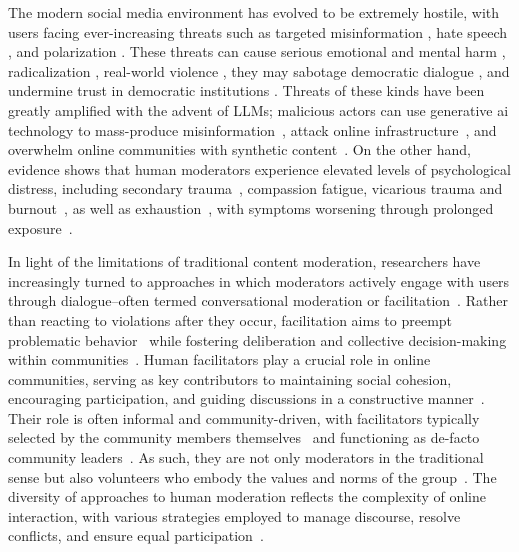 The modern social media environment has evolved to be extremely hostile, with users facing ever-increasing threats such as targeted misinformation \cite{clemons2025disinformation,Denniss2025Social}, hate speech \cite{kolluri2025parler}, and polarization \cite{pranesh2024impactsocialmediapolarization}. These threats can cause serious emotional and mental harm \cite{proactive_moderation}, radicalization \cite{cho-etal-2024-language}, real-world violence \cite{schaffner_community_guidelines}, they may sabotage democratic dialogue \cite{esau2017design,falk-etal-2021-predicting,seering_self_moderation}, and undermine trust in democratic institutions \cite{schroeder-etal-2024-fora}. Threats of these kinds have been greatly amplified with the advent of LLMs; malicious actors can use generative \ac{ai} technology to mass-produce misinformation~\cite{kreps2023ai, summerfield2024will}, attack online infrastructure~\cite{summerfield2024will}, and overwhelm online communities with synthetic content~\cite{saura2025synthetification}. On the other hand, evidence shows that human moderators experience elevated levels of psychological distress, including secondary trauma~\cite{spence2024content}, compassion fatigue, vicarious trauma and burnout~\cite{spence2023psychological}, as well as exhaustion~\cite{steiger2021psychological}, with symptoms worsening through prolonged exposure~\cite{spence2024content}.

In light of the limitations of traditional content moderation, researchers have increasingly turned to approaches in which moderators actively engage with users through dialogue--often termed conversational moderation or facilitation~\cite{argyle2023, korre2025evaluation, falk-etal-2021-predicting, cho-etal-2024-language}. Rather than reacting to violations after they occur, facilitation aims to preempt problematic behavior~\cite{cho-etal-2024-language,seering_self_moderation,cresci_pesonalized_interventions,make_reddit_great} while fostering deliberation and collective decision-making within communities~\cite{kim_et_al_chatbot,seering_self_moderation}. Human facilitators play a crucial role in online communities, serving as key contributors to maintaining social cohesion, encouraging participation, and guiding discussions in a constructive manner~\cite{bcause2023}. Their role is often informal and community-driven, with facilitators typically selected by the community members themselves~\cite{bcause2023} and functioning as de-facto community leaders~\cite{seering_self_moderation}. As such, they are not only moderators in the traditional sense but also volunteers who embody the values and norms of the group~\cite{korre2025evaluation}. The diversity of approaches to human moderation reflects the complexity of online interaction, with various strategies employed to manage discourse, resolve conflicts, and ensure equal participation~\cite{gao-etal-2025-moderation,schroeder-etal-2024-fora,chen-etal-2025-whow, park_et_al_2012_facilitation}. 


